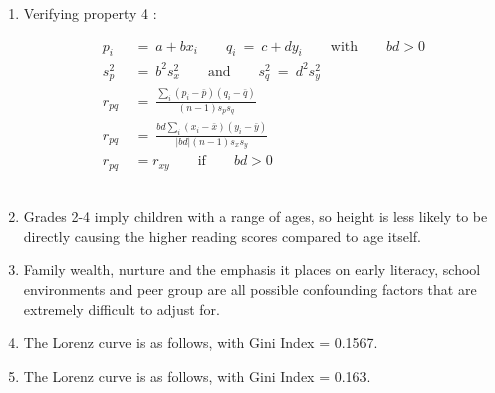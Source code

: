 \begin{enumerate}
	\item Verifying property 4 : 
	
	\begin{subequations}
		\begin{align}
			p_i \ &=\  a + b x_i \qquad q_i \ =\  c + d y_i \qquad \text{with} \qquad bd > 0 \\
			s_{p}^{2} \ &=\ b^2 s_{x}^2 \qquad \text{and} \qquad s_{q}^{2} \ =\ d^2 s_{y}^2 \\
			r_{pq} \ &=\ \frac{\sum_{i} (p_i - \bar{p}) (q_i - \bar{q})}{(n - 1) s_p s_q} \\
			r_{pq} \ &=\ \frac{bd \sum_{i} (x_i - \bar{x}) (y_i - \bar{y})}{|bd| (n - 1) s_{x} s_{y}} \\
			r_{pq} &= r_{xy} \qquad \text{if} \qquad bd > 0			
		\end{align}
	\end{subequations}\\
	
	\item Grades 2-4 imply children with a range of ages, so height is less likely to be directly causing the higher reading scores  compared to age itself. \\
	
	\item Family wealth, nurture and the emphasis it places on early literacy, school environments and peer group are all possible confounding factors that are extremely difficult to adjust for. \\
	
	\item The Lorenz curve is as follows, with Gini Index = 0.1567.
	
	\begin{figure}[H]
		\centering
	\end{figure} 
	
	\item The Lorenz curve is as follows, with Gini Index = 0.163. \\
	

\end{enumerate}

